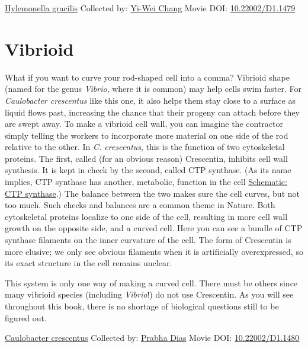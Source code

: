 \documentclass[]{tufte-book}
\begin{document}
\hypertarget{htmlwidget-5d9d3b92f8a76bc46c06}{}

\label{fig:3-3}\protect\hyperlink{tree}{Hylemonella gracilis} Collected by: \protect\hyperlink{yi-wei_chang}{Yi-Wei Chang} Movie DOI: \href{https://doi.org/10.22002/D1.1479}{10.22002/D1.1479}

\hypertarget{vibrioid}{%
\section{Vibrioid}\label{vibrioid}}

What if you want to curve your rod-shaped cell into a comma? Vibrioid shape (named for the genus \emph{Vibrio}, where it is common) may help cells swim faster. For \emph{Caulobacter crescentus} like this one, it also helps them stay close to a surface as liquid flows past, increasing the chance that their progeny can attach before they are swept away. To make a vibrioid cell wall, you can imagine the contractor simply telling the workers to incorporate more material on one side of the rod relative to the other. In \emph{C. crescentus}, this is the function of two cytoskeletal proteins. The first, called (for an obvious reason) Crescentin, inhibits cell wall synthesis. It is kept in check by the second, called CTP synthase. (As its name implies, CTP synthase has another, metabolic, function in the cell \protect\hyperlink{CTP_synthase}{Schematic: CTP synthase}.) The balance between the two makes sure the cell curves, but not too much. Such checks and balances are a common theme in Nature. Both cytoskeletal proteins localize to one side of the cell, resulting in more cell wall growth on the opposite side, and a curved cell. Here you can see a bundle of CTP synthase filaments on the inner curvature of the cell. The form of Crescentin is more elusive; we only see obvious filaments when it is artificially overexpressed, so its exact structure in the cell remains unclear.

This system is only one way of making a curved cell. There must be others since many vibrioid species (including \emph{Vibrio}!) do not use Crescentin. As you will see throughout this book, there is no shortage of biological questions still to be figured out.



\hypertarget{htmlwidget-6f9d30f6203e7e7444ea}{}

\label{fig:3-4}\protect\hyperlink{tree}{Caulobacter crescentus} Collected by: \protect\hyperlink{prabha_dias}{Prabha Dias} Movie DOI: \href{https://doi.org/10.22002/D1.1480}{10.22002/D1.1480}
\end{document}
